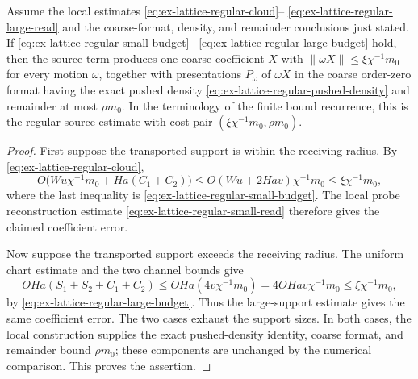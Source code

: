 \begin{proposition}
\label{prop:ex-lattice-regular-source-atom}
Assume the local estimates \eqref{eq:ex-lattice-regular-cloud}--
\eqref{eq:ex-lattice-regular-large-read} and the coarse-format,
density, and remainder conclusions just stated. If
\eqref{eq:ex-lattice-regular-small-budget}--
\eqref{eq:ex-lattice-regular-large-budget} hold, then the source term
produces one coarse coefficient \(X\) with
\(\|\omega X\|\le\xi\chi^{-1}m_0\) for every motion \(\omega\), together
with presentations \(P_\omega\) of \(\omega X\) in the coarse order-zero
format having the
exact pushed density \eqref{eq:ex-lattice-regular-pushed-density} and
remainder at most \(\rho m_0\). In the terminology
of the finite bound recurrence, this is the regular-source estimate with
cost pair \((\xi\chi^{-1}m_0,\rho m_0)\).
\end{proposition}
\begin{proof}
First suppose the transported support is within the receiving radius. By
\eqref{eq:ex-lattice-regular-cloud},
\[
O\bigl(Wu\chi^{-1}m_0+Ha(C_1+C_2)\bigr)
\leq O(Wu+2Hav)\chi^{-1}m_0\leq \xi\chi^{-1}m_0,
\]
where the last inequality is \eqref{eq:ex-lattice-regular-small-budget}.
The local probe reconstruction estimate
\eqref{eq:ex-lattice-regular-small-read} therefore gives the claimed
coefficient error.

Now suppose the transported support exceeds the receiving radius. The
uniform chart estimate and the two channel bounds give
\[
 OHa(S_1+S_2+C_1+C_2)
 \leq OHa(4v\chi^{-1}m_0)=4OHav\chi^{-1}m_0\leq \xi\chi^{-1}m_0,
\]
by \eqref{eq:ex-lattice-regular-large-budget}. Thus the large-support
estimate gives the same coefficient error. The two cases exhaust the
support sizes. In both cases, the local construction supplies the exact
pushed-density identity, coarse format, and remainder bound \(\rho m_0\);
these components are unchanged by the numerical comparison. This proves the
assertion.
\end{proof}

